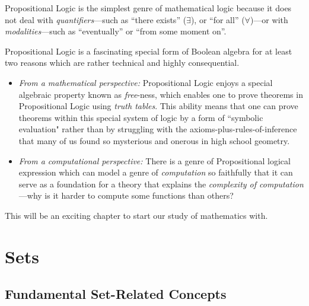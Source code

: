 \begin{itemize}
Propositional Logic is the simplest genre of mathematical logic because it does not deal with {\it quantifiers}---such as ``{\sc there exists}'' ($\exists$), or ``{\sc for all}'' ($\forall$)---or with {\it modalities}---such as ``{\sc eventually}'' or ``{\sc from some moment on}''.


\smallskip

Propositional Logic is a fascinating special form of Boolean algebra for at least two reasons which are rather technical and highly consequential.
  \begin{itemize}
  \item
{\em From a mathematical perspective:}
Propositional Logic enjoys a special algebraic property known as {\it free}-ness, which enables one to prove theorems in Propositional Logic using {\em truth tables}.  This ability means that one can prove theorems within this special system of logic by a form of ``symbolic evaluation" rather than by struggling with the axioms-plus-rules-of-inference that many of us found so mysterious and onerous in high school geometry.
  \medskip\item
{\em From a computational perspective:}
There is a genre of Propositional logical expression which can model a genre of {\em computation} so faithfully that it  can serve as a foundation for a theory that explains the {\em complexity of computation}---why is it harder to compute some functions than others?
  \end{itemize}
\end{itemize}

\medskip

This will be an exciting chapter to start our study of mathematics with.

\section{Sets}
\label{sec:sets}

\subsection{Fundamental Set-Related Concepts}
\label{sec:set-concepts}

